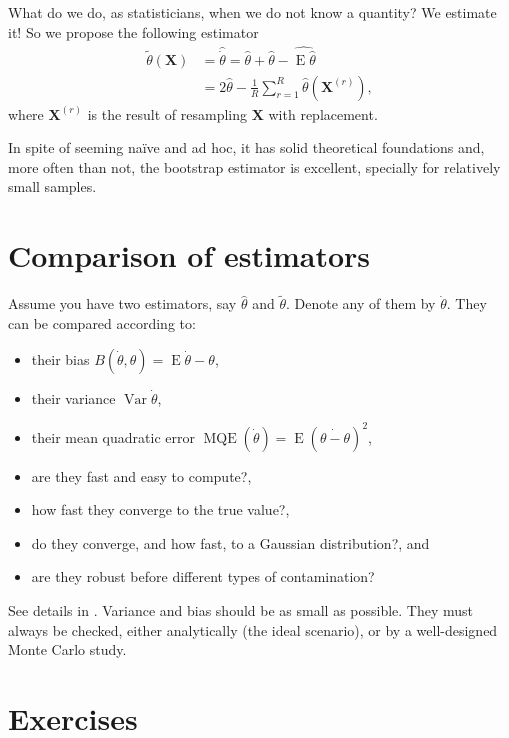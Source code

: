 What do we do, as statisticians, when we do not know a quantity?
We estimate it!
So we propose the following estimator
\begin{align}
\widetilde{\theta}(\bm X) &= \widehat{\dot{\theta}} = \widehat{\theta} + \widehat{\theta} - \widehat{\operatorname{E}\widehat{\theta}} \nonumber\\
 &= 2\widehat{\theta} - \frac1R\sum_{r=1}^{R} \widehat{\theta}(\bm X^{(r)}),
\end{align}
where $\bm X^{(r)}$ is the result of resampling $\bm X$ with replacement.

In spite of seeming na\"ive and ad hoc, it has solid theoretical foundations and, more often than not, the bootstrap estimator is excellent, specially for relatively small samples\cite{CribariFrerySilva:CSDA,%
VasconcellosFrerySilva:CompStat,%
SilvaCribariFrery:ImprovedLikelihood:Environmetrics}.

\section{Comparison of estimators}

Assume you have two estimators, say $\widehat{\theta}$ and $\widetilde{\theta}$.
Denote any of them by $\dot\theta$.
They can be compared according to:
\begin{itemize}
\item their bias $B(\dot{\theta},\theta)=\operatorname{E}\dot\theta-\theta$,
\item their variance $\operatorname{Var}\dot{\theta}$,
\item their mean quadratic error $\operatorname{MQE}(\dot{\theta}) = \operatorname{E}(\dot{\theta-\theta})^2$,
\item are they fast and easy to compute?,
\item how fast they converge to the true value?,
\item do they converge, and how fast, to a Gaussian distribution?, and
\item are they robust before different types of contamination?
\end{itemize}
See details in \citet{busto92}.
Variance and bias should be as small as possible.
They must always be checked, either analytically (the ideal scenario), or by a well-designed Monte Carlo study.

\section*{Exercises}

